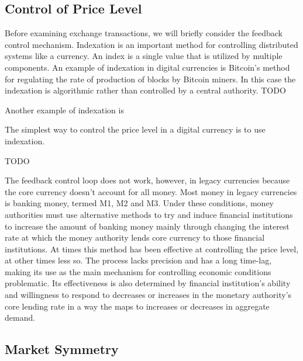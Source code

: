 \subsection{Control of Price Level}

Before examining exchange transactions, we will briefly consider the feedback control mechanism.
Indexation is an important method for controlling distributed systems like a currency. An index is a
single value that is utilized by multiple components. An example of indexation in digital currencies
is Bitcoin's method for regulating the rate of production of blocks by Bitcoin miners. In this case
the indexation is algorithmic rather than controlled by a central authority. TODO

Another example of indexation is 

The simplest way to control the price level in a digital currency is to use indexation.





TODO

The feedback control loop does not work, however, in legacy currencies because the core currency
doesn't account for all money. Most money in legacy currencies is banking money, termed M1, M2 and
M3. Under these conditions, money authorities must use alternative methods to try and induce
financial institutions to increase the amount of banking money mainly through changing the interest
rate at which the money authority lends core currency to those financial institutions. At times this
method has been effective at controlling the price level, at other times less so. The process lacks
precision and has a long time-lag, making its use as the main mechanism for controlling economic
conditions problematic. Its effectiveness is also determined by financial institution's ability and
willingness to respond to decreases or increases in the monetary authority's core lending rate in a
way the maps to increases or decreases in aggregate demand.

\subsection{Market Symmetry}
